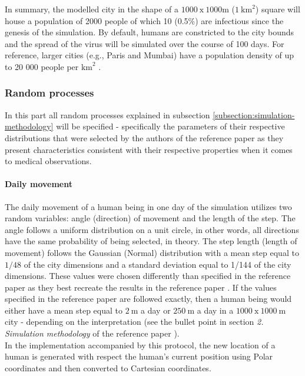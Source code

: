 \documentclass[a4paper]{article}
\begin{document}
In summary, the modelled city in the shape of a $1000\:\textrm{x}\:1000\textrm{m}$ ($1\: \textrm{km}^2$) square will house a population of 2000 people of which 10 (0.5\%) are infectious since the genesis of the simulation. By default, humans are constricted to the city bounds and the spread of the virus will be simulated over the course of 100 days. For reference, larger cities (e.g., Paris and Mumbai) have a population density of up to 20 000 people per $\textrm{km}^2$ \cite{GnfKtXcXYiGm8NmR}\cite{YyQLmGbzBu9Drxx5}.


\subsubsection{Random processes}
In this part all random processes explained in subsection \ref{subsection:simulation-methodology} will be specified - specifically the parameters of their respective distributions that were selected by the authors of the reference paper \cite{Maltezos2021} as they present characteristics consistent with their respective properties when it comes to medical observations.

\paragraph{Daily movement}
The daily movement of a human being in one day of the simulation utilizes two random variables: angle (direction) of movement and the length of the step. The angle follows a uniform distribution on a unit circle, in other words, all directions have the same probability of being selected, in theory. The step length (length of movement) follows the Gaussian (Normal) distribution with a mean step equal to $1/48$ of the city dimensions and a standard deviation equal to 1/144 of the city dimensions. These values were chosen differently than specified in the reference paper as they best recreate the results in the reference paper \cite{Maltezos2021}. If the values specified in the reference paper \cite{Maltezos2021} are followed exactly, then a human being would either have a mean step equal to $2\:\textrm{m}$ a day or $250\:\textrm{m}$ a day in a $1000\:\textrm{x}\:1000\:\textrm{m}$ city - depending on the interpretation (see the  bullet point in section \textit{2. Simulation methodology} of the reference paper \cite{Maltezos2021}).\\
In the implementation accompanied by this protocol, the new location of a human is generated with respect the human's current position using Polar coordinates and then converted to Cartesian coordinates.
\end{document}
